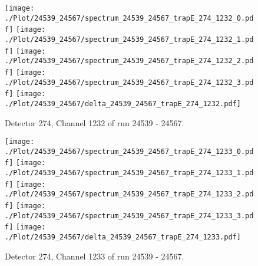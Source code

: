 \clearpage
\begin{figure}[hb]
\centering
\texttt{[image: ./Plot/24539\_24567/spectrum\_24539\_24567\_trapE\_274\_1232\_0.pdf]}
\texttt{[image: ./Plot/24539\_24567/spectrum\_24539\_24567\_trapE\_274\_1232\_1.pdf]}
\texttt{[image: ./Plot/24539\_24567/spectrum\_24539\_24567\_trapE\_274\_1232\_2.pdf]}
\texttt{[image: ./Plot/24539\_24567/spectrum\_24539\_24567\_trapE\_274\_1232\_3.pdf]}
\texttt{[image: ./Plot/24539\_24567/delta\_24539\_24567\_trapE\_274\_1232.pdf]}
\caption{ Detector 274, Channel 1232 of run 24539 - 24567.}
\label{fig:24539_24567_trapE_274_1232}
\end{figure}
\clearpage
\begin{figure}[hb]
\centering
\texttt{[image: ./Plot/24539\_24567/spectrum\_24539\_24567\_trapE\_274\_1233\_0.pdf]}
\texttt{[image: ./Plot/24539\_24567/spectrum\_24539\_24567\_trapE\_274\_1233\_1.pdf]}
\texttt{[image: ./Plot/24539\_24567/spectrum\_24539\_24567\_trapE\_274\_1233\_2.pdf]}
\texttt{[image: ./Plot/24539\_24567/spectrum\_24539\_24567\_trapE\_274\_1233\_3.pdf]}
\texttt{[image: ./Plot/24539\_24567/delta\_24539\_24567\_trapE\_274\_1233.pdf]}
\caption{ Detector 274, Channel 1233 of run 24539 - 24567.}
\label{fig:24539_24567_trapE_274_1233}
\end{figure}
\clearpage
